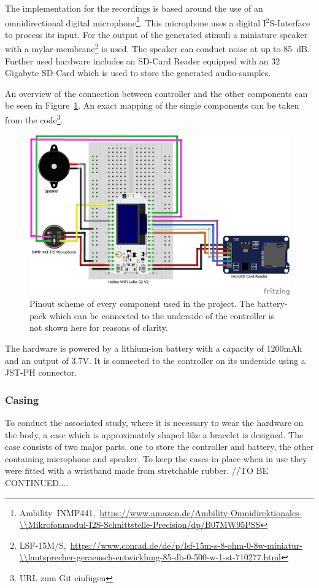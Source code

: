 The implementation for the recordings is based around the use of an omnidirectional digital microphone\footnote{Ambility~INMP441,~\url{https://www.amazon.de/Ambility-Omnidirektionales-\\Mikrofonmodul-I2S-Schnittstelle-Precision/dp/B07MW95PSS}}.
This microphone uses a digital I$^{2}$S-Interface to process its input. 
For the output of the generated stimuli a miniature speaker with a mylar-membrane\footnote{LSF-15M/S,~\url{https://www.conrad.de/de/p/lsf-15m-s-8-ohm-0-8w-miniatur-\\lautsprecher-geraeusch-entwicklung-85-db-0-500-w-1-st-710277.html}} is used.
The speaker can conduct noise at up to 85~dB.
Further used hardware includes an SD-Card Reader equipped with an 32 Gigabyte SD-Card which is used to store the generated audio-samples.

An overview of the connection between controller and the other components can be seen in Figure~\ref{fig:pinout}.
An exact mapping of the single components can be taken from the code\footnote{URL zum Git einfügen}.
\begin{figure}[H]
	\includegraphics[width=\linewidth]{Media/Hardware_Pinout.png}
	\caption{Pinout scheme of every component used in the project. The battery-pack which can be connected to the underside of the controller is not shown here for reasons of clarity.}
	\label{fig:pinout}
\end{figure}
The hardware is powered by a lithium-ion battery with a capacity of 1200mAh and an output of 3.7V.
It is connected to the controller on its underside using a JST-PH connector. 

\subsubsection{Casing}
To conduct the associated study, where it is necessary to wear the hardware on the body, a case which is approximately shaped like a bracelet is designed.
The case consists of two major parts, one to store the controller and battery, the other containing microphone and speaker.
To keep the cases in place when in use they were fitted with a wristband made from stretchable rubber.
//TO BE CONTINUED....

